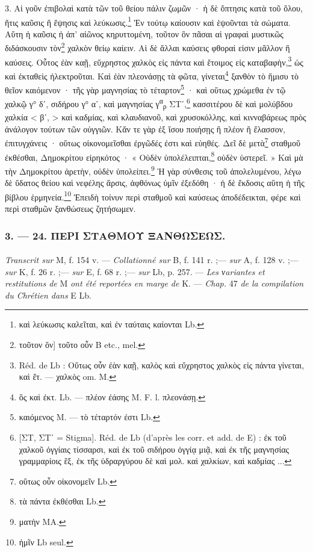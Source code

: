 \documentclass[landscape, a4paper, 11pt, oneside, polutonikogreek, french]{article}
\begin{document}
3. Αἱ γοῦν ἐπιβολαὶ κατὰ τῶν τοῦ θείου πάλιν ζωμῶν · ἡ δὲ ὄπτησις κατὰ τοῦ ὅλου, ἥτις καῦσις ἢ ἕψησις καὶ λεύκωσις.\footnote{καὶ λεύκωσις καλεῖται, καὶ ἐν ταύταις καίονται Lb.} Ἐν τούτῳ καίουσιν καὶ ἑψοῦνται τὰ σώματα. Αὕτη ἡ καῦσις ἡ ἀπ' αἰῶνος κηρυττομένη, τοῦτον ὃν πᾶσαι αἱ γραφαὶ μυστικῶς διδάσκουσιν τὸν\footnote{τοῦτον ὃν] τοῦτο οὖν B etc., mel.} χαλκὸν θείῳ καίειν. Αἱ δὲ ἄλλαι καύσεις φθοραί εἰσιν μᾶλλον ἢ καύσεις. Οὗτος ἐὰν καῇ, εὔχρηστος χαλκὸς εἰς πάντα καὶ ἔτοιμος εἰς καταβαφὴν,\footnote{Réd. de Lb : Οὕτως οὖν ἐὰν καῇ, καλὸς καὶ εὔχρηστος χαλκὸς εἰς πάντα γίνεται, καὶ ἔτ. --- χαλκὸς om. M.} ὡς καὶ ἐκταθεὶς ἠλεκτροῦται. Καὶ ἐὰν πλεονάσῃς τὰ φῶτα, γίνεται\footnote{ὃς καὶ ἐκτ. Lb. --- πλέον ἐάσης M. F. l. πλεονάσῃ.} ξανθὸν τὸ ἥμισυ τὸ θεῖον καιόμενον · τῆς γὰρ μαγνησίας τὸ τέταρτον\footnote{καιόμενος M. --- τὸ τέταρτόν ἐστι Lb.} · καὶ οὕτως χρώμεθα ἐν τῷ χαλκῷ γ° δʹ, σιδήρου γ° αʹ, καὶ μαγνησίας γ\textsuperscript{α}\textsubscript{ρ} ΣΤʹ,\footnote{[ΣΤ, ΣΤʹ = Stigma]. Réd. de Lb (d'après les corr. et add. de E) : ἐκ τοῦ χαλκοῦ ὀγγίαις τίσσαρσι, καὶ ἐκ τοῦ σιδήρου ὀγγίᾳ μιᾷ, καὶ ἐκ τῆς μαγνησίας γραμμαρίοις ἓξ, ἐκ τῆς ὑδραργύρου δὲ καὶ μολ. καὶ χαλκίων, καὶ καδμίας ...} κασσιτέρου δὲ καὶ μολύβδου χαλκία < βʹ, > καὶ καδμίας, καὶ κλαυδιανοῦ, καὶ χρυσοκόλλης, καὶ κινναβάρεως πρὸς ἀνάλογον τούτων τῶν οὐγγιῶν. Κἄν τε γὰρ ἐξ ἴσου ποιήσῃς ἢ πλέον ἢ ἔλασσον, ἐπιτυγχάνεις · οὕτως οἰκονομεῖσθαι ἐργῶδές ἐστι καὶ εὐηθές. Δεῖ δὲ μετὰ\footnote{οὕτως οὖν οἰκονομεῖν Lb.} σταθμοῦ ἐκθέσθαι, Δημοκρίτου εἰρηκότος · « Οὐδὲν ὑπολέλειπται,\footnote{τὰ πάντα ἐκθέσθαι Lb.} οὐδὲν ὑστερεῖ. » Καὶ μὰ τὴν Δημοκρίτου ἀρετὴν, οὐδὲν ὑπολείπει.\footnote{ματὴν MA.} Ἡ γὰρ σύνθεσις τοῦ ἀπολελυμένου, λέγω δὲ ὕδατος θείου καὶ νεφέλης ἄρσις, ἀφθόνως ὑμῖν ἐξεδόθη · ἡ δὲ ἔκδοσις αὕτη ἡ τῆς βίβλου ἑρμηνεία.\footnote{ἡμῖν Lb seul.} Ἐπειδὴ τοίνυν περὶ σταθμοῦ καὶ καύσεως ἀποδέδεικται, φέρε καὶ περὶ σταθμῶν ξανθώσεως ζητήσωμεν.

\bigskip
\centerline{\EightStarTaper}
\centerline{\EightStarTaper\EightStarTaper}
\bigskip

\subsubsection{3. --- 24. ΠΕΡΙ ΣΤΑΘΜΟΥ ΞΑΝΘΩΣΕΩΣ.}
\paragraph{}
\emph{Transcrit sur} M, f. 154 v. --- \emph{Collationné sur} B, f. 141 r. ;--- \emph{sur} A, f. 128 v. ;--- \emph{sur} K, f. 26 r. ;--- \emph{sur} E, f. 68 r. ;--- \emph{sur} Lb, p. 257. --- \emph{Les νariantes et restitutions de} M \emph{ont été reportées en marge de} K. --- \emph{Chap.} 47 \emph{de la compilation du Chrétien dans} E Lb.
\end{document}
